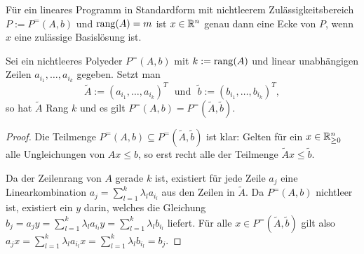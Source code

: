 \begin{satz}\label{satz-ecke-basislsg}
Für ein lineares Programm in Standardform mit nichtleerem Zulässigkeitsbereich $P:=P^=(A,b)$ und $\operatorname{rang}(A) = m$ ist $x\in\mathbb{R}^n$ genau dann eine Ecke von $P$, wenn $x$ eine zulässige Basislösung ist.
\end{satz}

\begin{proposition}\label{prop-rank-obda-m}
	Sei ein nichtleeres Polyeder $P^=(A, b)$ mit $k:=\operatorname{rang}(A)$ und linear unabhängigen Zeilen $a_{i_1},\dots, a_{i_k}$ gegeben.
	Setzt man \[
	\tilde{A}:= (a_{i_1}, \dots, a_{i_k})^T\text{~ und ~}\tilde{b}:= (b_{i_1}, \dots, b_{i_k})^T, \]
	 so hat $\tilde{A}$ Rang $k$ und es gilt $P^=(A,b) = P^=(\tilde{A}, \tilde{b})$.
\end{proposition}
\begin{proof}
	Die Teilmenge $P^=(A,b)\subseteq P^=(\tilde{A}, \tilde{b})$ ist klar:
	Gelten für ein $x\in\mathbb{R}^n_{\geq0}$ alle Ungleichungen von $Ax \leq b$, so erst recht alle der Teilmenge $\tilde{A}x \leq \tilde{b}$.
	
	Da der Zeilenrang von $A$ gerade $k$ ist, existiert für jede Zeile $a_j$ eine Linearkombination $a_j=\sum_{l=1}^k \lambda_l a_{i_l}$ aus den Zeilen in $\tilde{A}$.
	Da $P^=(A,b)$ nichtleer ist, existiert ein $y$ darin, welches die Gleichung
	$b_j = a_j y = \sum_{l=1}^k \lambda_l a_{i_l} y = \sum_{l=1}^k \lambda_l b_{i_l}$ liefert.
	Für alle $x\in P^=(\tilde{A}, \tilde{b})$ gilt also $a_j x = \sum_{l=1}^k \lambda_l a_{i_l} x = \sum_{l=1}^k \lambda_l b_{i_l} = b_j$.
\end{proof}

